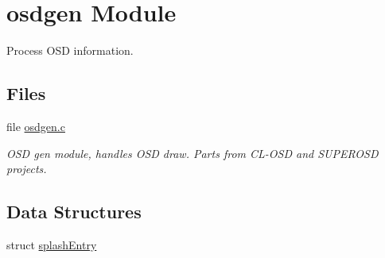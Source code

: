 \hypertarget{group___o_s_d_g_e_n_module}{\section{osdgen Module}
\label{group___o_s_d_g_e_n_module}
}


Process O\-S\-D information.  


\subsection*{Files}
\begin{DoxyCompactItemize}
\item 
file \hyperlink{osdgen_8c}{osdgen.\-c}
\begin{DoxyCompactList}\small\item\em O\-S\-D gen module, handles O\-S\-D draw. Parts from C\-L-\/\-O\-S\-D and S\-U\-P\-E\-R\-O\-S\-D projects. \end{DoxyCompactList}\end{DoxyCompactItemize}
\subsection*{Data Structures}
\begin{DoxyCompactItemize}
\item 
struct \hyperlink{structsplash_entry}{splash\-Entry}
\end{DoxyCompactItemize}

